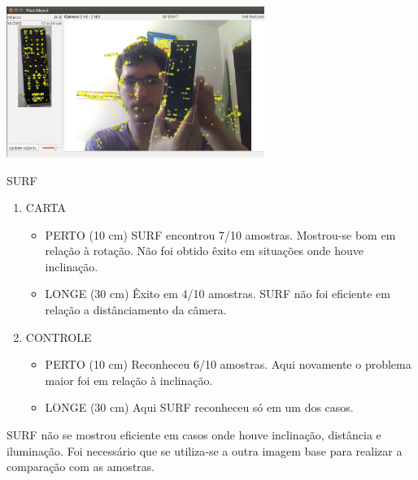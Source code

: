 \documentclass[conference]{IEEEtran}
\begin{document}
		\vspace{2\baselineskip}\vspace{-\parskip}
 		\begin{minipage}{\linewidth}
 		\centering
 		\includegraphics[width=3.3in]{controle10longe}
 		\end{minipage}	
 
 
 \vspace{1.2\baselineskip}\vspace{-\parskip} 
 
\centering  SURF
 \begin{enumerate}
  \item CARTA
    \begin{itemize}
     \item PERTO (10 cm)
      SURF encontrou 7/10 amostras. Mostrou-se bom em rela\c{c}\~ao \`a rota\c{c}\~ao. N\~ao foi obtido \^exito em situa\c{c}\~oes 
      onde houve inclina\c{c}\~ao.
     \item LONGE (30 cm)
      \^Exito em 4/10 amostras. SURF n\~ao foi eficiente em rela\c{c}\~ao a dist\^anciamento da c\^amera.
    \end{itemize}
  \item CONTROLE
    \begin{itemize}
     \item PERTO (10 cm)
      Reconheceu 6/10 amostras. Aqui novamente o problema maior foi em rela\c{c}\~ao \`a inclina\c{c}\~ao.
     \item LONGE (30 cm)
      Aqui SURF reconheceu s\'o em um dos casos.
    \end{itemize}
 \end{enumerate}

 \vspace{1.2\baselineskip}\vspace{-\parskip} 
 \raggedright
\nobreak\hspace{.16667em plus .08333em} 
 SURF n\~ao se mostrou eficiente em casos onde houve inclina\c{c}\~ao, dist\^ancia e ilumina\c{c}\~ao. Foi necess\'ario que 
 se utiliza-se a outra imagem base para realizar a compara\c{c}\~ao com as amostras.
 
\end{document}

